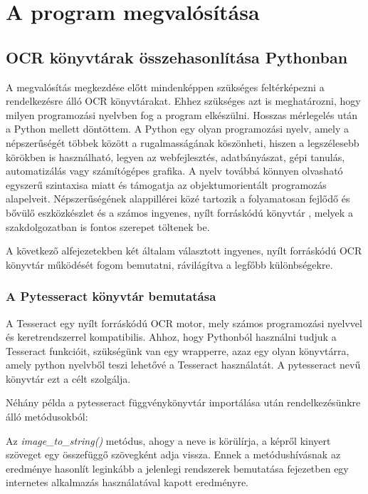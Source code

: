 \documentclass[12pt]{report}
\begin{document}
\chapter{A program megvalósítása}
\section{OCR könyvtárak összehasonlítása Pythonban}

A megvalósítás megkezdése előtt mindenképpen szükséges feltérképezni a rendelkezésre álló OCR könyvtárakat. Ehhez szükséges azt is meghatározni, hogy milyen programozási nyelvben fog a program elkészülni. Hosszas mérlegelés után a Python mellett döntöttem. A Python egy olyan programozási nyelv, amely a népszerűségét többek között a rugalmasságának köszönheti, hiszen a legszélesebb körökben is használható, legyen az webfejlesztés, adatbányászat, gépi tanulás, automatizálás vagy számítógépes grafika. A nyelv továbbá könnyen olvasható egyszerű szintaxisa miatt és támogatja az objektumorientált programozás alapelveit. Népszerűségének alappillérei közé tartozik a folyamatosan fejlődő és bővülő eszközkészlet és a számos ingyenes, nyílt forráskódú könyvtár \cite{python}, melyek a szakdolgozatban is fontos szerepet töltenek be.

A következő alfejezetekben két általam választott ingyenes, nyílt forráskódú OCR könyvtár működését fogom bemutatni, rávilágítva a legfőbb különbségekre.

\subsection{A Pytesseract könyvtár bemutatása}

A Tesseract egy nyílt forráskódú OCR motor, mely számos programozási nyelvvel és keretrendszerrel kompatibilis.
Ahhoz, hogy Pythonból használni tudjuk a Tesseract funkcióit, szükségünk van egy wrapperre, azaz egy olyan könyvtárra, amely python nyelvből teszi lehetővé a Tesseract használatát. A pytesseract nevű könyvtár ezt a célt szolgálja. \cite{pytesseract2}

\pagebreak

Néhány példa a pytesseract függvénykönyvtár importálása után rendelkezésünkre álló metódusokból: \cite{pytesseract}

Az \emph{image\_to\_string()} metódus, ahogy a neve is körülírja, a képről kinyert szöveget egy összefüggő szövegként adja vissza. Ennek a metódushívásnak az eredménye hasonlít leginkább a jelenlegi rendszerek bemutatása fejezetben egy internetes alkalmazás használatával kapott eredményre.
\end{document}
